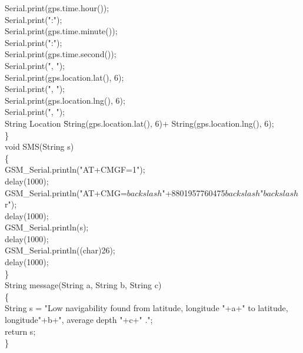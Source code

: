\documentclass[12pt, top = 1 inch, bottom = 1 inch, left = 1.2 inch, top = .8 inch]{book}
\begin{document}
		Serial.print(gps.time.hour());\\
		Serial.print(":");\\
		Serial.print(gps.time.minute());\\
		Serial.print(":");\\
		Serial.print(gps.time.second());\\
		Serial.print(", ");\\
		
		Serial.print(gps.location.lat(), 6);\\
		Serial.print(", ");\\
		
		Serial.print(gps.location.lng(), 6);\\
		Serial.print(", ");\\
		String Location \= String(gps.location.lat(), 6)+ String(gps.location.lng(), 6);\\
	\}\\
	void SMS(String s)\\
	\{\\
		GSM\_Serial.println("AT+CMGF=1");\\
		delay(1000);\\
		GSM\_Serial.println("AT+CMG=$backslash$"+8801957760475$backslash$"$backslash$r");\\
		delay(1000);\\
		GSM\_Serial.println(s);\\
		delay(1000);\\
		GSM\_Serial.println((char)26);\\
		delay(1000);\\
	\}\\
	String message(String a, String b, String c)\\
	\{\\
		String s = "Low navigability found from latitude, longitude "+a+" to latitude, longitude"+b+", average depth "+c+" .";\\
		return s;\\
	\}		\\
\end{document}

